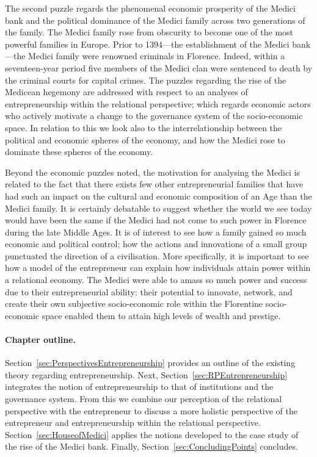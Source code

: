 The second puzzle regards the phenomenal economic prosperity of the Medici bank and the political dominance of the Medici family across two generations of the family. The Medici family rose from obscurity to become one of the most powerful families in Europe. Prior to 1394---the establishment of the Medici bank---the Medici family were renowned criminals in Florence. Indeed, within a seventeen-year period five members of the Medici clan were sentenced to death by the criminal courts for capital crimes. The puzzles regarding the rise of the Medicean hegemony are addressed with respect to an analyses of entrepreneurship within the relational perspective; which regards economic actors who actively motivate a change to the governance system of the socio-economic space. In relation to this we look also to the interrelationship between the political and economic spheres of the economy, and how the Medici rose to dominate these spheres of the economy.

Beyond the economic puzzles noted, the motivation for analysing the Medici is related to the fact that there exists few other entrepreneurial families that have had such an impact on the cultural and economic composition of an Age than the Medici family. It is certainly debatable to suggest whether the world we see today would have been the same if the Medici had not come to such power in Florence during the late Middle Ages. It is of interest to see how a family gained so much economic and political control; how the actions and innovations of a small group punctuated the direction of a civilisation. More specifically, it is important to see how a model of the entrepreneur can explain how individuals attain power within a relational economy. The Medici were able to amass so much power and success due to their entrepreneurial ability: their potential to innovate, network, and create their own subjective socio-economic role within the Florentine socio-economic space enabled them to attain high levels of wealth and prestige.

\paragraph{Chapter outline.}

Section~\ref{sec:PerspectivesEntrepreneurship} provides an outline of the existing theory regarding entrepreneurship. Next, Section~\ref{sec:RPEntrepreneurship} integrates the notion of entrepreneurship to that of institutions and the governance system. From this we combine our perception of the relational perspective with the entrepreneur to discuss a more holistic perspective of the entrepreneur and entrepreneurship within the relational perspective. Section~\ref{sec:HouseofMedici} applies the notions developed to the case study of the rise of the Medici bank. Finally, Section~\ref{sec:ConcludingPoints} concludes.

